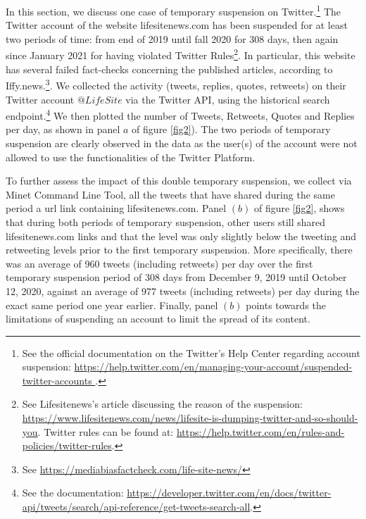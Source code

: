 \documentclass[11pt,a4paper]{article}
\begin{document}
In this section, we discuss one case of temporary suspension on Twitter.\footnote{See the official documentation on the Twitter's Help Center regarding account suspension: \href{https://help.twitter.com/en/managing-your-account/suspended-twitter-accounts}{https://help.twitter.com/en/managing-your-account/suspended-twitter-accounts }.} The Twitter account of the website lifesitenews.com has been suspended for at least two periods of time: from end of 2019 until fall 2020 for 308 days, then again since January 2021 for having violated Twitter Rules\footnote{See Lifesitenews's article discussing the reason of the suspension: \href{https://www.lifesitenews.com/news/lifesite-is-dumping-twitter-and-so-should-you}{https://www.lifesitenews.com/news/lifesite-is-dumping-twitter-and-so-should-you}. Twitter rules can be found at: \href{https://help.twitter.com/en/rules-and-policies/twitter-rules}{https://help.twitter.com/en/rules-and-policies/twitter-rules}. }. In particular, this website has several failed fact-checks concerning the published articles, according to Iffy.news.\footnote{See \href{https://mediabiasfactcheck.com/life-site-news/}{https://mediabiasfactcheck.com/life-site-news/}}. We collected the activity (tweets, replies, quotes, retweets) on their Twitter account $@LifeSite$ via the Twitter API, using the historical search endpoint.\footnote{See the documentation: \href{https://developer.twitter.com/en/docs/twitter-api/tweets/search/api-reference/get-tweets-search-all}{https://developer.twitter.com/en/docs/twitter-api/tweets/search/api-reference/get-tweets-search-all}.} We then plotted the number of Tweets, Retweets, Quotes and Replies per day, as shown in panel $a$ of figure \ref{fig2}). The two periods of temporary suspension are clearly observed in the data as the user(s) of the account were not allowed to use the functionalities of the Twitter Platform. 

\smallskip

To further assess the impact of this double temporary suspension, we collect via Minet Command Line Tool\cite{minet}, all the tweets that have shared during the same period a url link containing lifesitenews.com. Panel $(b)$ of figure \ref{fig2}, shows that during both periods of temporary suspension, other users still shared lifesitenews.com links and that the level was only slightly below the tweeting and retweeting levels prior to the first temporary suspension. More specifically, there was an average of 960 tweets (including retweets) per day over the first temporary suspension period of 308 days from December 9, 2019 until October 12, 2020, against an average of 977 tweets (including retweets) per day during the exact same period one year earlier. Finally, panel $(b)$ points towards the limitations of suspending an account to limit the spread of its content. 
\end{document}
